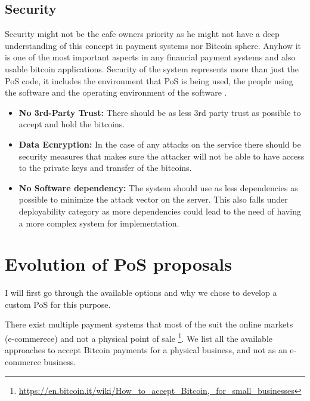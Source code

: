 \subsection{Security} Security might not be the cafe owners priority as he might not have a deep understanding of this concept in payment systems nor Bitcoin sphere. Anyhow it is one of the most important aspects in any financial payment systems and also usable bitcoin applications. Security of the system represents more than just the PoS code, it includes the environment that PoS is being used, the people using the software and the operating environment of the software \cite{securityreq}.
\begin{itemize}

\item \textbf{No 3rd-Party Trust: }There should be as less 3rd party trust as possible to accept and hold the bitcoins.

\item \textbf{Data Ecnryption: }In the case of any attacks on the service there should be security measures that makes sure the attacker will not be able to have access to the private keys and transfer of the bitcoins.

\item \textbf{No Software dependency: }The system should use as less dependencies as possible to minimize the attack vector on the server. This also falls under deployability category as more dependencies could lead to the need of having a more complex system for implementation. %

\end{itemize}

\section{Evolution of PoS proposals}
I will first go through the available options and why we chose to develop a custom PoS for this purpose.

There exist multiple payment systems that most of the suit the online markets (\eg e-commerece) and not a physical point of sale \footnote{\url{https://en.bitcoin.it/wiki/How_to_accept_Bitcoin,_for_small_businesses}}. We list all the available approaches to accept Bitcoin payments for a physical business, and not as an e-commerce business.

